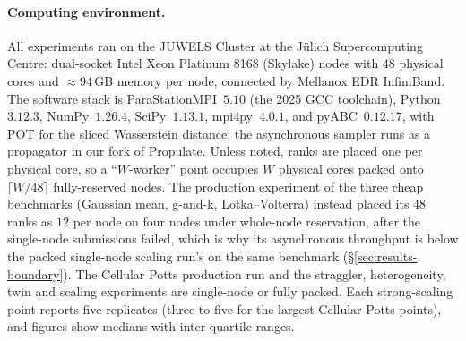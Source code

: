 \documentclass[pdflatex,sn-mathphys-num]{sn-jnl}
\theoremstyle{plain}
\theoremstyle{definition}
\begin{document}
\begin{appendices}
\paragraph{Computing environment.} All experiments ran on the JUWELS Cluster at the J\"ulich Supercomputing Centre: dual-socket Intel Xeon Platinum 8168 (Skylake) nodes with $48$ physical cores and ${\approx}94$\,GB memory per node, connected by Mellanox EDR InfiniBand. The software stack is ParaStationMPI~$5.10$ (the 2025 GCC toolchain), Python~$3.12.3$, NumPy~$1.26.4$, SciPy~$1.13.1$, mpi4py~$4.0.1$, and pyABC~$0.12.17$, with POT \cite{flamary2021pot} for the sliced Wasserstein distance; the asynchronous sampler runs as a propagator in our fork of Propulate. Unless noted, ranks are placed one per physical core, so a ``$W$-worker'' point occupies $W$ physical cores packed onto $\lceil W/48\rceil$ fully-reserved nodes. The production experiment of the three cheap benchmarks (Gaussian mean, g-and-k, Lotka--Volterra) instead placed its $48$ ranks as $12$ per node on four nodes under whole-node reservation, after the single-node submissions failed, which is why its asynchronous throughput is below the packed single-node scaling run's on the same benchmark (\S\ref{sec:results-boundary}). The Cellular Potts production run and the straggler, heterogeneity, twin and scaling experiments are single-node or fully packed. Each strong-scaling point reports five replicates (three to five for the largest Cellular Potts points), and figures show medians with inter-quartile ranges.


\end{appendices}
\end{document}
